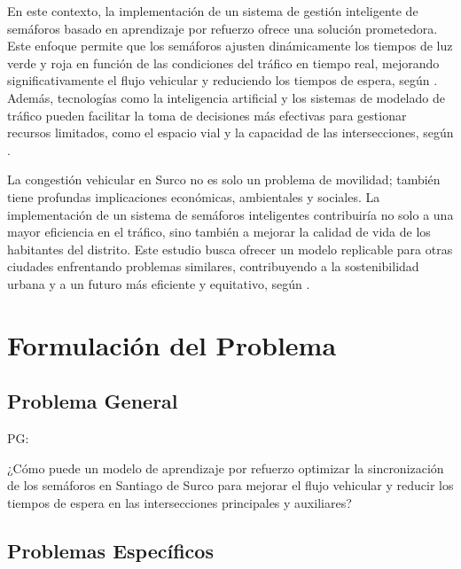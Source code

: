 En este contexto, la implementación de un sistema de gestión inteligente de semáforos basado en aprendizaje por refuerzo ofrece una solución prometedora. Este enfoque permite que los semáforos ajusten dinámicamente los tiempos de luz verde y roja en función de las condiciones del tráfico en tiempo real, mejorando significativamente el flujo vehicular y reduciendo los tiempos de espera, según \cite{swarco2024}. Además, tecnologías como la inteligencia artificial y los sistemas de modelado de tráfico pueden facilitar la toma de decisiones más efectivas para gestionar recursos limitados, como el espacio vial y la capacidad de las intersecciones, según \cite{sabogal2019}.

La congestión vehicular en Surco no es solo un problema de movilidad; también tiene profundas implicaciones económicas, ambientales y sociales. La implementación de un sistema de semáforos inteligentes contribuiría no solo a una mayor eficiencia en el tráfico, sino también a mejorar la calidad de vida de los habitantes del distrito. Este estudio busca ofrecer un modelo replicable para otras ciudades enfrentando problemas similares, contribuyendo a la sostenibilidad urbana y a un futuro más eficiente y equitativo, según \cite{wagner2024}.

\section{Formulación del Problema}

\subsection{Problema General}
PG: \newcommand{\ProblemaGeneral}{
¿Cómo puede un modelo de aprendizaje por refuerzo optimizar la sincronización de los semáforos en Santiago de Surco para mejorar el flujo vehicular y reducir los tiempos de espera en las intersecciones principales y auxiliares?
}
\ProblemaGeneral
\subsection{Problemas Específicos}
\newcommand{\Pbone}{
¿Cómo afecta la falta de un modelo dinámico de aprendizaje por refuerzo a la optimización de los tiempos de los ciclos de luz verde y roja en las intersecciones principales?
}
\newcommand{\Pbtwo}{
¿Qué tan eficaz puede ser el uso de un modelo de aprendizaje por refuerzo para reducir los tiempos de espera en las intersecciones principales de Santiago de Surco durante diferentes franjas horarias?
}
\newcommand{\Pbthree}{
¿Cómo podría un modelo de aprendizaje por refuerzo sincronizar de manera eficiente los semáforos de las vías principales con sus auxiliares para mejorar el flujo vehicular?
}
\newcommand{\Pbfour}{
¿Qué resultados pueden observarse al aplicar un modelo de aprendizaje por refuerzo en las intersecciones seleccionadas, en comparación con los sistemas de semáforos tradicionales?
}

